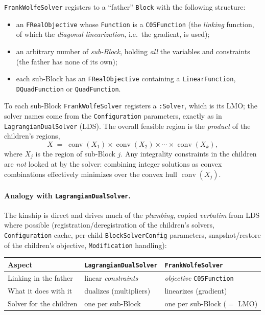 \documentclass[11pt,a4paper]{article}
\newcommand{\conv}{\operatorname{conv}}
\newcommand{\code}[1]{\texttt{#1}}
\theoremstyle{plain}
\theoremstyle{remark}
\begin{document}
\code{FrankWolfeSolver} registers to a ``father'' \code{Block} with the following
structure:
\begin{itemize}[nosep]
  \item an \code{FRealObjective} whose \code{Function} is a \code{C05Function}
        (the \emph{linking} function, of which the \emph{diagonal linearization},
        i.e.\ the gradient, is used);
  \item an arbitrary number of \emph{sub-Block}, holding \emph{all} the variables
        and constraints (the father has none of its own);
  \item each sub-Block has an \code{FRealObjective} containing a
        \code{LinearFunction}, \code{DQuadFunction} or \code{QuadFunction}.
\end{itemize}
To each sub-Block \code{FrankWolfeSolver} registers a \code{:Solver}, which is its
LMO; the solver names come from the \code{Configuration} parameters, exactly as in
\code{LagrangianDualSolver} (LDS). The overall feasible region is the
\emph{product} of the children's regions,
\begin{equation}\label{eq:X}
  X \;=\; \conv(X_1)\times\conv(X_2)\times\cdots\times\conv(X_k),
\end{equation}
where $X_j$ is the region of sub-Block $j$. Any integrality constraints in the
children are \emph{not} looked at by the solver: combining integer solutions as
convex combinations effectively minimizes over the convex hull $\conv(X_j)$.

\paragraph{Analogy with \code{LagrangianDualSolver}.}
The kinship is direct and drives much of the \emph{plumbing}, copied
\emph{verbatim} from LDS where possible (registration/deregistration of the
children's solvers, \code{Configuration} cache, per-child \code{BlockSolverConfig}
parameters, snapshot/restore of the children's objective, \code{Modification}
handling):

\begin{center}
\begin{tabular}{@{}lll@{}}
\toprule
Aspect & \code{LagrangianDualSolver} & \code{FrankWolfeSolver}\\
\midrule
Linking in the father & linear \emph{constraints}      & \emph{objective} \code{C05Function}\\
What it does with it  & dualizes (multipliers)          & linearizes (gradient)\\
Solver for the children & one per sub-Block             & one per sub-Block ($=$ LMO)\\
\bottomrule
\end{tabular}
\end{center}
\end{document}
